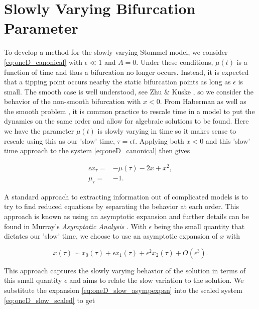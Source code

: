 \section{Slowly Varying Bifurcation Parameter}
\label{sec:oneD_slow}

To develop a method for the slowly varying Stommel model, we consider \eqref{eq:oneD_canonical} with $\epsilon\ll 1$ and $A=0$. Under these conditions, $\mu(t)$ is a function of time and thus a bifurcation no longer occurs. Instead, it is expected that a tipping point occurs nearby the static bifurcation points as long as $\epsilon$ is small. The smooth case is well understood, see Zhu \& Kuske \cite{zhu2015tipping}, so we consider the behavior of the non-smooth bifurcation with $x<0$. From Haberman \cite{haberman1979slowly} as well as the smooth problem \cite{zhu2015tipping}, it is common practice to rescale time in a model to put the dynamics on the same order and allow for algebraic solutions to be found. Here we have the parameter $\mu(t)$ is slowly varying in time so it makes sense to rescale using this as our 'slow' time, $\tau=\epsilon t$. Applying both $x<0$ and this 'slow' time approach to the system \eqref{eq:oneD_canonical} then gives

\begin{equation}\label{eq:oneD_slow_scaled}
\begin{aligned}
\epsilon x_\tau=&-\mu(\tau)-2x+x^2,\\
\mu_\tau=&-1.
\end{aligned}
\end{equation}

A standard approach to extracting information out of complicated models is to try to find reduced equations by separating the behavior at each order. This approach is known as using an asymptotic expansion and further details can be found in Murray's \textit{Asymptotic Analysis} \cite{murray2012asymptotic}. With $\epsilon$ being the small quantity that dictates our 'slow' time, we choose to use an asymptotic expansion of $x$ with

\begin{equation}\label{eq:oneD_slow_asympexpan}
x(\tau)\sim x_0(\tau)+\epsilon x_1(\tau)+\epsilon^2 x_2(\tau)+O(\epsilon^3).
\end{equation}

This approach captures the slowly varying behavior of the solution in terms of this small quantity $\epsilon$ and aims to relate the slow variation to the solution. We substitute the expansion \eqref{eq:oneD_slow_asympexpan} into the scaled system \eqref{eq:oneD_slow_scaled} to get

